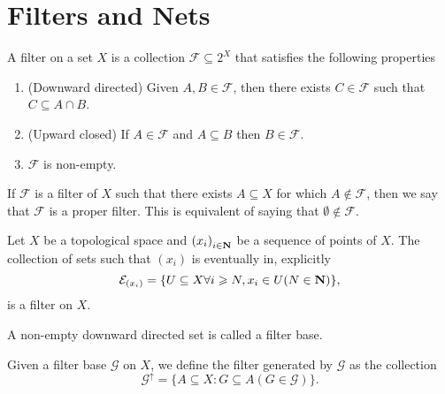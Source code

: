 \section{Filters and Nets}

\begin{definition}\label{def: filter}
    A filter on a set \(X\) is a collection \(\mathcal F \subseteq 2^X\) that
    satisfies the following properties
    \begin{enumerate}[(F1)]
        \item\label{def: filter F1}
        (Downward directed) Given \(A, B \in \mathcal F\), then there exists
        \(C \in \mathcal F\) such that \(C \subseteq A \cap B\).
        \item\label{def: filter F2}
        (Upward closed) If \(A \in \mathcal F\) and \(A \subseteq B\) then \(B
        \in \mathcal F\).
        \item\label{def: filter F3}
        \(\mathcal F\) is non-empty.
    \end{enumerate}
\end{definition}

\begin{definition}
    If \(\mathcal F\) is a filter of \(X\) such that there exists \(A \subseteq
    X\) for which \(A \not\in \mathcal F\), then we say that \(\mathcal F\) is a
    proper filter. This is equivalent of saying that \(\emptyset \not\in \mathcal
    F\).
\end{definition}

\begin{proposition}
    Let \(X\) be a topological space and \({(x_i)}_{i \in \mathbf{N}}\) be a
    sequence of points of \(X\). The collection of sets such that \((x_i)\) is
    eventually in, explicitly
    \[
        \mathcal E_{(x_i)} = \{U \subseteq X \relax \forall i \geqslant N, x_i \in U (N \in
        \mathbf{N})\},
    \]
    is a filter on \(X\).
\end{proposition}

\begin{definition}
    A non-empty downward directed set is called a filter base.
\end{definition}

\begin{proposition}
    Given a filter base \(\mathcal G\) on \(X\), we define the filter generated by
    \(\mathcal G\) as the collection
    \[
        \mathcal G^\uparrow = \{A \subseteq X \colon G \subseteq A (G \in \mathcal G)\}.
    \]
\end{proposition}

